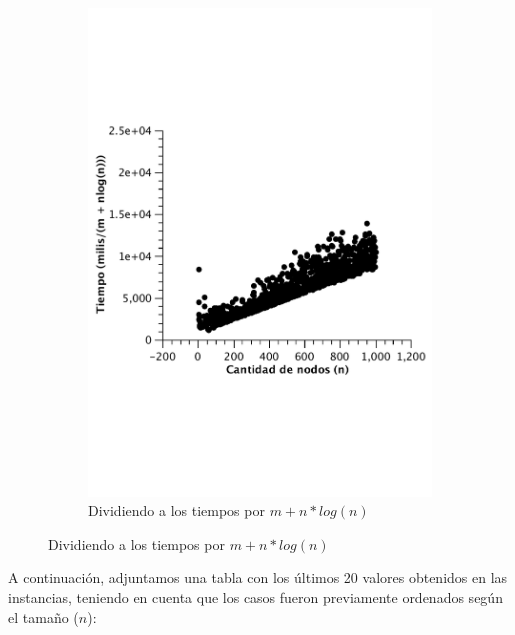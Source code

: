 \begin{figure}[H]
        \begin{subfigure}[b]{0.5\textwidth}
                \includegraphics[width=\textwidth]{imagenes/completo-matriz-4.pdf}
                \caption{Dividiendo a los tiempos por $m + n*log(n)$}
        \end{subfigure}
\end{figure}

A continuación, adjuntamos una tabla con los últimos 20 valores obtenidos en las instancias, teniendo en cuenta que los casos fueron previamente ordenados según el tamaño ($n$):

